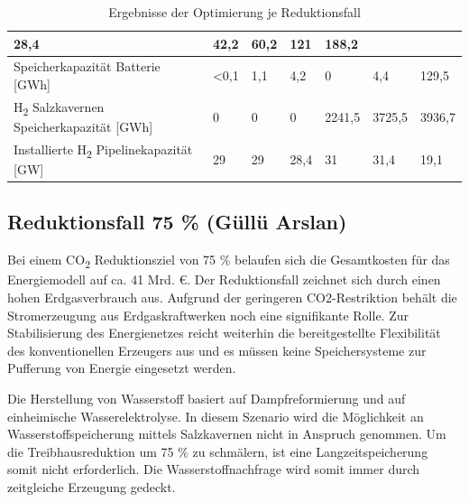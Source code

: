 \begin{table}[!ht]
\begin{tabular}{|l|llllll|}
      \multicolumn{1}{l|}{28,4} &
      \multicolumn{1}{l|}{42,2} &
      \multicolumn{1}{l|}{60,2} &
      \multicolumn{1}{l|}{121} &
      188,2 \\ \hline
    {Speicherkapazität Batterie {[}GWh{]}} &
      \multicolumn{1}{l|}{\textless{}0,1} &
      \multicolumn{1}{l|}{1,1} &
      \multicolumn{1}{l|}{4,2} &
      \multicolumn{1}{l|}{0} &
      \multicolumn{1}{l|}{4,4} &
      129,5 \\ \hline
    {H\textsubscript{2} Salzkavernen Speicherkapazität {[}GWh{]}} &
      \multicolumn{1}{l|}{0} &
      \multicolumn{1}{l|}{0} &
      \multicolumn{1}{l|}{0} &
      \multicolumn{1}{l|}{2241,5} &
      \multicolumn{1}{l|}{3725,5} &
      3936,7 \\ \hline
    {Installierte H\textsubscript{2} Pipelinekapazität {[}GW{]}} &
      \multicolumn{1}{l|}{29} &
      \multicolumn{1}{l|}{29} &
      \multicolumn{1}{l|}{28,4} &
      \multicolumn{1}{l|}{31} &
      \multicolumn{1}{l|}{31,4} &
      19,1 \\ \hline
    \end{tabular}
    \caption{Ergebnisse der Optimierung je Reduktionsfall
    }
    \label{tab:ueberreduktion}
    \end{table}

\subsection{Reduktionsfall 75 \% (Güllü Arslan)}
Bei einem CO\textsubscript{2} Reduktionsziel von 75 \% belaufen sich die Gesamtkosten für das Energiemodell auf ca. 41 Mrd. €. Der Reduktionsfall zeichnet sich durch einen hohen Erdgasverbrauch aus. Aufgrund der geringeren CO2-Restriktion behält die Stromerzeugung aus Erdgaskraftwerken noch eine signifikante Rolle. Zur Stabilisierung des Energienetzes reicht weiterhin die bereitgestellte Flexibilität des konventionellen Erzeugers aus und es müssen keine Speichersysteme zur Pufferung von Energie eingesetzt werden. 

Die Herstellung von Wasserstoff basiert auf Dampfreformierung und auf einheimische Wasserelektrolyse. In diesem Szenario wird die Möglichkeit an Wasserstoffspeicherung mittels Salzkavernen nicht in Anspruch genommen. Um die Treibhausreduktion um 75 \% zu schmälern, ist eine Langzeitspeicherung somit nicht erforderlich. Die Wasserstoffnachfrage wird somit immer durch zeitgleiche Erzeugung gedeckt.

